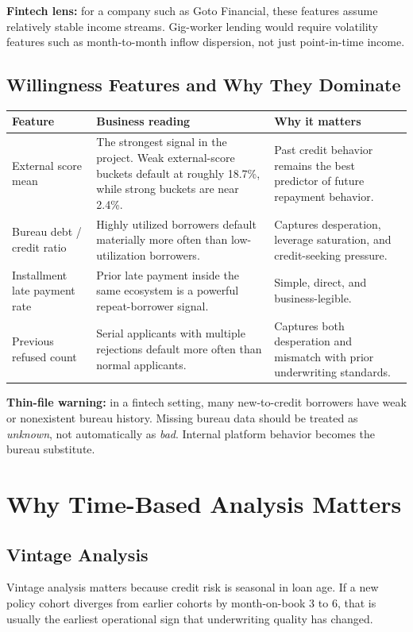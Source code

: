 \documentclass[11pt]{article}
\begin{document}
\textbf{Fintech lens:} for a company such as Goto Financial, these features assume relatively stable income streams. Gig-worker lending would require volatility features such as month-to-month inflow dispersion, not just point-in-time income.

\subsection{Willingness Features and Why They Dominate}

{\small
\begin{tabularx}{\textwidth}{@{}P{0.29\textwidth}P{0.32\textwidth}Y@{}}
\toprule
Feature & Business reading & Why it matters \\
\midrule
External score mean & The strongest signal in the project. Weak external-score buckets default at roughly 18.7\%, while strong buckets are near 2.4\%. & Past credit behavior remains the best predictor of future repayment behavior. \\
Bureau debt / credit ratio & Highly utilized borrowers default materially more often than low-utilization borrowers. & Captures desperation, leverage saturation, and credit-seeking pressure. \\
Installment late payment rate & Prior late payment inside the same ecosystem is a powerful repeat-borrower signal. & Simple, direct, and business-legible. \\
Previous refused count & Serial applicants with multiple rejections default more often than normal applicants. & Captures both desperation and mismatch with prior underwriting standards. \\
\bottomrule
\end{tabularx}
}

\textbf{Thin-file warning:} in a fintech setting, many new-to-credit borrowers have weak or nonexistent bureau history. Missing bureau data should be treated as \emph{unknown}, not automatically as \emph{bad}. Internal platform behavior becomes the bureau substitute.

\section{Why Time-Based Analysis Matters}

\subsection{Vintage Analysis}

Vintage analysis matters because credit risk is seasonal in loan age. If a new policy cohort diverges from earlier cohorts by month-on-book 3 to 6, that is usually the earliest operational sign that underwriting quality has changed.
\end{document}
